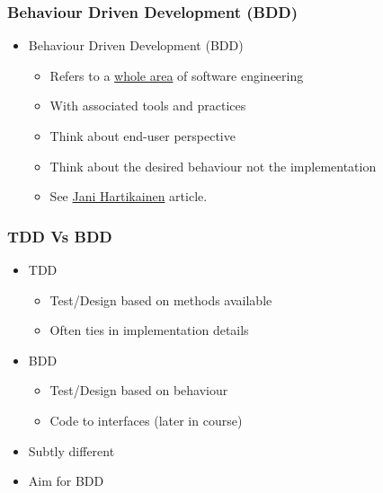\subsubsection{Behaviour Driven Development
(BDD)}\label{behaviour-driven-development-bdd}

\begin{itemize}
\itemsep1pt\parskip0pt
\item
  Behaviour Driven Development (BDD)

  \begin{itemize}
  \itemsep1pt\parskip0pt
  \item
    Refers to a
    \href{https://en.wikipedia.org/wiki/Behavior-driven_development}{whole
    area} of software engineering
  \item
    With associated tools and practices
  \item
    Think about end-user perspective
  \item
    Think about the desired behaviour not the implementation
  \item
    See
    \href{https://codeutopia.net/blog/2015/03/01/unit-testing-tdd-and-bdd/}{Jani
    Hartikainen} article.
  \end{itemize}
\end{itemize}

\subsubsection{TDD Vs BDD}\label{tdd-vs-bdd}

\begin{itemize}
\itemsep1pt\parskip0pt
\item
  TDD

  \begin{itemize}
  \itemsep1pt\parskip0pt
  \item
    Test/Design based on methods available
  \item
    Often ties in implementation details
  \end{itemize}
\item
  BDD

  \begin{itemize}
  \itemsep1pt\parskip0pt
  \item
    Test/Design based on behaviour\\
  \item
    Code to interfaces (later in course)
  \end{itemize}
\item
  Subtly different
\item
  Aim for BDD
\end{itemize}

